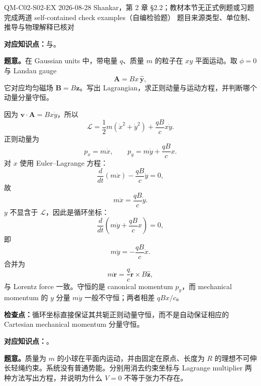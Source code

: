 \exercisemeta
  {QM-C02-S02-EX}
  {2026-08-28}
  {Shankar，第 2 章 \S 2.2；教材本节无正式例题或习题}
  {完成两道 self-contained check examples（自编检验题）}
  {题目来源类型、单位制、推导与物理解释已核对}


\textbf{对应知识点：}与。

\textbf{题意。}在 Gaussian units 中，带电量 $q$、质量 $m$ 的粒子在 $xy$ 平面运动。取 $\phi=0$ 与 Landau gauge
\[
  \bm A=Bx\,\hat{\bm y},
\]
它对应均匀磁场 $\bm B=B\hat{\bm z}$。写出 Lagrangian，求正则动量与运动方程，并判断哪个动量分量守恒。

\begin{checkedsolution}
因为 $\bm v\cdot\bm A=Bx\dot y$，所以
\begin{equation}
  \mathcal L
  =\frac12m(\dot x^2+\dot y^2)+\frac{qB}{c}x\dot y.
  \label{eq:QM-C02-S02-E01-lagrangian}
\end{equation}
正则动量为
\begin{equation}
  p_x=m\dot x,
  \qquad
  p_y=m\dot y+\frac{qB}{c}x.
  \label{eq:QM-C02-S02-E01-canonical-momenta}
\end{equation}
对 $x$ 使用 Euler--Lagrange 方程：
\[
  \frac{d}{dt}(m\dot x)-\frac{qB}{c}\dot y=0,
\]
故
\[
  m\ddot x=\frac{qB}{c}\dot y.
\]
$y$ 不显含于 $\mathcal L$，因此是循环坐标：
\[
  \frac{d}{dt}\left(m\dot y+\frac{qB}{c}x\right)=0,
\]
即
\[
  m\ddot y=-\frac{qB}{c}\dot x.
\]
合并为
\begin{equation}
  m\ddot{\bm r}
  =\frac qc\dot{\bm r}\times B\hat{\bm z},
  \label{eq:QM-C02-S02-E01-lorentz}
\end{equation}
与 Lorentz force 一致。守恒的是 canonical momentum $p_y$，而 mechanical momentum 的 $y$ 分量 $m\dot y$ 一般不守恒；两者相差 $qBx/c$。
\end{checkedsolution}

\textbf{检查点：}循环坐标直接保证其共轭正则动量守恒，而不是自动保证相应的 Cartesian mechanical momentum 分量守恒。


\textbf{对应知识点：}。

\textbf{题意。}质量为 $m$ 的小球在平面内运动，并由固定在原点、长度为 $R$ 的理想不可伸长轻绳约束。系统没有普通势能。分别用消去约束坐标与 Lagrange multiplier 两种方法写出方程，并说明为什么 $V=0$ 不等于张力不存在。

